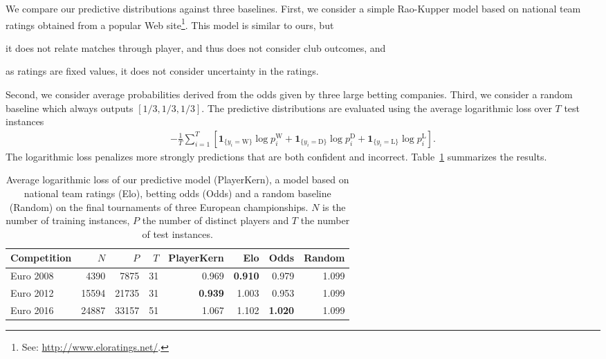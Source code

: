 We compare our predictive distributions against three baselines.
First, we consider a simple Rao-Kupper model based on national team ratings obtained from a popular Web site\footnote{See: \url{http://www.eloratings.net/}.}.
This model is similar to ours, but
\begin{enuminline}
\item it does not relate matches through player, and thus does not consider club outcomes, and
\item as ratings are fixed values, it does not consider uncertainty in the ratings.
\end{enuminline}
Second, we consider average probabilities derived from the odds given by three large betting companies.
Third, we consider a random baseline which always outputs $[1/3, 1/3, 1/3]$.
The predictive distributions are evaluated using the average logarithmic loss over $T$ test instances
\begin{align*}
- \frac{1}{T} \sum_{i=1}^{T} \left[
\mathbf{1}_{\{y_i = \text{W}\}} \log p^{\text{W}}_i
+ \mathbf{1}_{\{y_i = \text{D}\}} \log p^{\text{D}}_i
+ \mathbf{1}_{\{y_i = \text{L}\}} \log p^{\text{L}}_i
\right].
\end{align*}
The logarithmic loss penalizes more strongly predictions that are both confident and incorrect.
Table~\ref{pk:tab:eval} summarizes the results.


\begin{table}[t]
  \caption{
  Average logarithmic loss of our predictive model (PlayerKern), a model based on national team ratings (Elo), betting odds (Odds) and a random baseline (Random) on the final tournaments of three European championships.
  $N$ is the number of training instances, $P$ the number of distinct players and $T$ the number of test instances.}
  \label{pk:tab:eval}
  \centering
  \setlength\tabcolsep{0.2cm}
  \begin{tabular}{l rr rrrrr}
    \toprule
    Competition & $N$         & $P$         & $T$      & PlayerKern           & Elo                  & Odds                 &  Random \\
    \midrule
    Euro 2008   & \num{4390}  & \num{7875}  & \num{31} & \num{0.969}          & \textbf{\num{0.910}} & \num{0.979}          & \num{1.099} \\
    Euro 2012   & \num{15594} & \num{21735} & \num{31} & \textbf{\num{0.939}} & \num{1.003}          & \num{0.953}          & \num{1.099} \\
    Euro 2016   & \num{24887} & \num{33157} & \num{51} & \num{1.067}          & \num{1.102}          & \textbf{\num{1.020}} & \num{1.099} \\
    \bottomrule
  \end{tabular}
\end{table}

